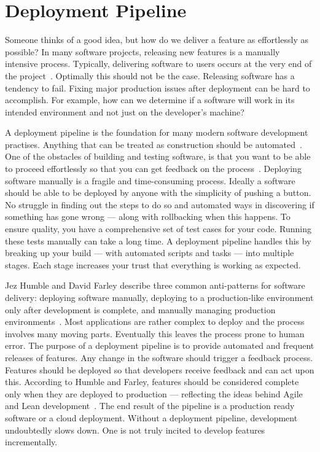 \documentclass[english]{tktltiki2}
\begin{document}

\section{Deployment Pipeline}

Someone thinks of a good idea, but how do we deliver a feature as effortlessly as possible? In many software projects, releasing new features is a manually intensive process. Typically, delivering software to users occurs at the very end of the project~\cite{HAB12}. Optimally this should not be the case. Releasing software has a tendency to fail. Fixing major production issues after deployment can be hard to accomplish. For example, how can we determine if a software will work in its intended environment and not just on the developer’s machine?

A deployment pipeline is the foundation for many modern software development practises. Anything that can be treated as construction should be automated~\cite{Fow05}. One of the obstacles of building and testing software, is that you want to be able to proceed effortlessly so that you can get feedback on the process~\cite{Fow13b}. Deploying software manually is a fragile and time-consuming process. Ideally a software should be able to be deployed by anyone with the simplicity of pushing a button. No struggle in finding out the steps to do so and automated ways in discovering if something has gone wrong — along with rollbacking when this happens. To ensure quality, you have a comprehensive set of test cases for your code. Running these tests manually can take a long time. A deployment pipeline handles this by breaking up your build — with automated scripts and tasks — into multiple stages. Each stage increases your trust that everything is working as expected.

Jez Humble and David Farley describe three common anti-patterns for software delivery: deploying software manually, deploying to a production-like environment only after development is complete, and manually managing production environments~\cite{HF11}. Most applications are rather complex to deploy and the process involves many moving parts. Eventually this leaves the process prone to human error. The purpose of a deployment pipeline is to provide automated and frequent releases of features. Any change in the software should trigger a feedback process. Features should be deployed so that developers receive feedback and can act upon this. According to Humble and Farley, features should be considered complete only when they are deployed to production — reflecting the ideas behind Agile and Lean development~\cite{HF11}. The end result of the pipeline is a production ready software or a cloud deployment. Without a deployment pipeline, development undoubtedly slows down. One is not truly incited to develop features incrementally.
\end{document}
